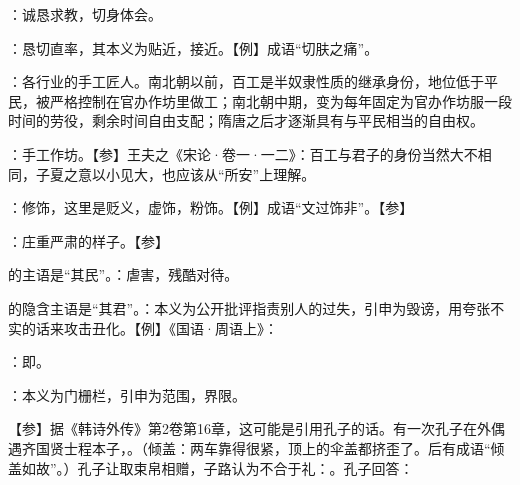 {
\item {}：诚恳求教，切身体会。

：恳切直率，其本义为贴近，接近。【例】成语“切肤之痛”。
}
{}


{
\item {}：各行业的手工匠人。南北朝以前，百工是半奴隶性质的继承身份，地位低于平民，被严格控制在官办作坊里做工；南北朝中期，变为每年固定为官办作坊服一段时间的劳役，剩余时间自由支配；隋唐之后才逐渐具有与平民相当的自由权。
\item {}：手工作坊。【参】王夫之《宋论·卷一·一二》：百工与君子的身份当然大不相同，子夏之意以小见大，也应该从“所安”上理解。
}
{}


{
\item {}：修饰，这里是贬义，虚饰，粉饰。【例】成语“文过饰非”。【参】
}
{}


{
\item {}：庄重严肃的样子。【参】
}
{}


{
\item {}的主语是“其民”。：虐害，残酷对待。
\item {}的隐含主语是“其君”。：本义为公开批评指责别人的过失，引申为毁谤，用夸张不实的话来攻击丑化。【例】《国语·周语上》：
}
{}


{
\begin{lyitemize}
\item {}：即。
\item {}：本义为门栅栏，引申为范围，界限。
\end{lyitemize}
【参】据《韩诗外传》第2卷第16章，这可能是引用孔子的话。有一次孔子在外偶遇齐国贤士程本子，。（倾盖：两车靠得很紧，顶上的伞盖都挤歪了。后有成语“倾盖如故”。）孔子让取束帛相赠，子路认为不合于礼：。孔子回答：
}
{}


